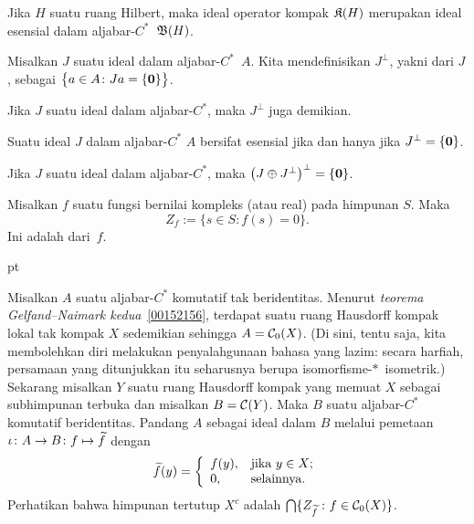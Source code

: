 \begin{exam} Jika $H$ suatu ruang Hilbert, maka ideal operator kompak $\mathfrak{K}(H)$
merupakan ideal esensial dalam aljabar-$C^*$~$\mathfrak{B}(H)$.
\end{exam}

\begin{defn} Misalkan $J$ suatu ideal dalam aljabar-$C^*$~$A$. Kita mendefinisikan
$J^\perp$, yakni
 dari $J$, sebagai $\bigl\{a \in A\colon Ja = \{\mathbf{0}\}\bigr\}$.
\end{defn}

\begin{prop} Jika $J$ suatu ideal dalam aljabar-$C^*$, maka $J^\perp$ juga demikian.
\end{prop}

\begin{prop}\label{0038465} Suatu ideal $J$ dalam aljabar-$C^*$ $A$ bersifat esensial jika dan hanya
jika $J^\perp = \{\mathbf{0}\}$.
\end{prop}

\begin{prop}\label{0038468} Jika $J$ suatu ideal dalam aljabar-$C^*$, maka $\bigl(J \oplus
J^\perp\bigr)^\perp = \{\mathbf{0}\}$.
\end{prop}

\begin{notn} Misalkan $f$ suatu fungsi bernilai kompleks (atau real) pada himpunan $S$. Maka
  \[ Z_f := \{ s \in S\colon f(s) = 0\}. \]
Ini adalah
 dari~$f$.
\end{notn}

  pt

Misalkan $A$ suatu aljabar-$C^*$ komutatif tak beridentitas. Menurut
\emph{teorema Gelfand--Naimark kedua}~\ref{00152156}, terdapat suatu ruang Hausdorff kompak lokal tak kompak
$X$ sedemikian sehingga $A = \mathcal{C}_0(X)$. (Di sini, tentu saja, kita membolehkan
diri melakukan penyalahgunaan bahasa yang lazim: secara harfiah, persamaan yang ditunjukkan itu
seharusnya berupa isomorfisme-$*\,$ isometrik.) Sekarang misalkan $Y$ suatu ruang Hausdorff kompak
yang memuat $X$ sebagai subhimpunan terbuka dan misalkan $B = \mathcal{C}(Y)$. Maka $B$ suatu aljabar-$C^*$
komutatif beridentitas. Pandang $A$ sebagai ideal dalam $B$ melalui pemetaan
$\iota\colon A \rightarrow B\colon f \mapsto \widetilde{f}$ dengan
  \[ \wt f(y) = \left\{%
                \begin{array}{ll}
                         f(y), & \hbox{jika $y \in X$;} \\
                         0, & \hbox{selainnya.} \\
                \end{array}%
                \right.\]
Perhatikan bahwa himpunan tertutup $X^c$ adalah $\bigcap\{Z_{\widetilde{f}}\,\colon f \in \mathcal{C}_0(X)\}$.

